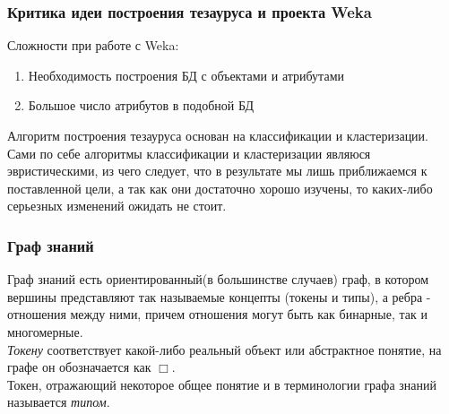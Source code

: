 \documentclass{beamer}
\begin{document}
\begin{frame}
\frametitle{Критика идеи построения тезауруса и проекта Weka}

Сложности при работе с Weka:
\begin{enumerate}
\item{Необходимость построения БД с объектами и атрибутами}
\item{Большое число атрибутов в подобной БД}
\end{enumerate}


Алгоритм построения тезауруса основан на классификации и кластеризации.
Сами по себе алгоритмы классификации и кластеризации являюся эвристическими,
из чего следует, что в результате мы лишь приближаемся к поставленной цели, 
а так как они достаточно хорошо изучены, то каких-либо серьезных изменений ожидать не стоит.

\end{frame}

\begin{frame}
\frametitle{Граф знаний}
Граф знаний есть ориентированный(в большинстве случаев) граф, в котором вершины представляют так называемые концепты (токены и типы),
а ребра - отношения между ними, причем отношения могут быть как бинарные, так и многомерные.\\ 

\textsl{Токену} соответствует какой-либо реальный объект или абстрактное понятие, на графе он обозначается как $\Box$. \\

Токен, отражающий некоторое общее понятие и в терминологии графа знаний называется \textsl{типом}.\\
\end{frame}
\end{document}
